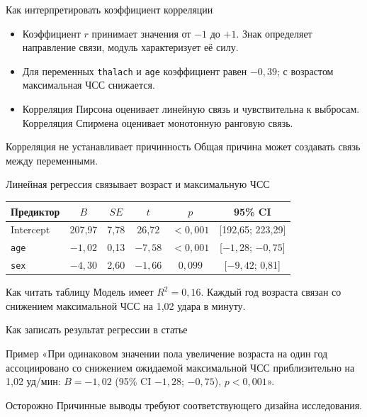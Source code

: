 \documentclass[aspectratio=169]{beamer}
\begin{document}
\begin{frame}{Как интерпретировать коэффициент корреляции}
  \begin{itemize}
    \item Коэффициент $r$ принимает значения от $-1$ до $+1$. Знак определяет направление связи, модуль характеризует её силу.
    \item Для переменных \texttt{thalach} и \texttt{age} коэффициент равен $-0{,}39$; с возрастом максимальная ЧСС снижается.
    \item Корреляция Пирсона оценивает линейную связь и чувствительна к выбросам. Корреляция Спирмена оценивает монотонную ранговую связь.
  \end{itemize}
  \begin{alertblock}{Корреляция не устанавливает причинность}
    Общая причина может создавать связь между переменными.
  \end{alertblock}
\end{frame}

\begin{frame}{Линейная регрессия связывает возраст и максимальную ЧСС}
  \centering\footnotesize
  \begin{tabular}{lccccc}
    \textbf{Предиктор} & $B$ & $SE$ & $t$ & $p$ & 95\% CI \\ \hline
    Intercept & 207,97 & 7,78 & 26,72 & $<0{,}001$ & [192,65; 223,29] \\
    \texttt{age} & $-1{,}02$ & 0,13 & $-7{,}58$ & $<0{,}001$ & [$-1{,}28$; $-0{,}75$] \\
    \texttt{sex} & $-4{,}30$ & 2,60 & $-1{,}66$ & $0{,}099$ & [$-9{,}42$; 0,81]
  \end{tabular}
  \par\vspace{0.3cm}
  \begin{block}{Как читать таблицу}
    Модель имеет $R^2 = 0{,}16$. Каждый год возраста связан со снижением максимальной ЧСС на 1,02 удара в минуту.
  \end{block}
\end{frame}

\begin{frame}{Как записать результат регрессии в статье}
  \begin{block}{Пример}
    «При одинаковом значении пола увеличение возраста на один год ассоциировано со снижением ожидаемой максимальной ЧСС приблизительно на 1,02 уд/мин: $B = -1{,}02$ (95\% CI $-1{,}28$; $-0{,}75$), $p < 0{,}001$».
  \end{block}
  \begin{alertblock}{Осторожно}
    Причинные выводы требуют соответствующего дизайна исследования.
  \end{alertblock}
\end{frame}
\end{document}
